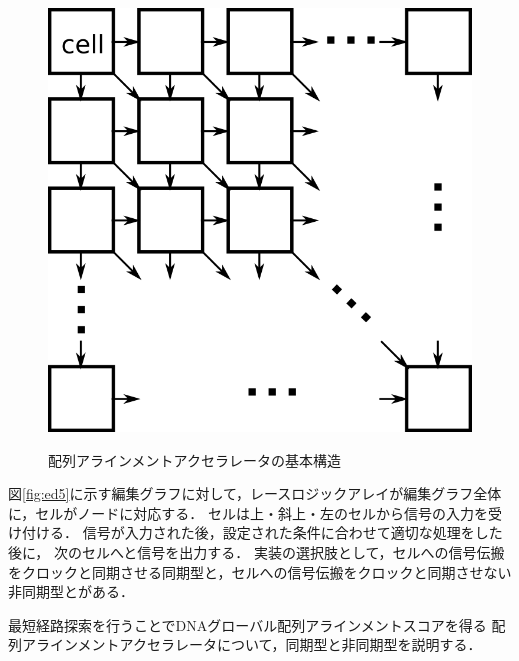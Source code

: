\begin{figure}[t!]
\begin{center}
{\includegraphics[keepaspectratio,scale=0.3]{fig/2/lightracelogic_2.png}}
\caption{配列アラインメントアクセラレータの基本構造}
\label{fig:racelogicarray}
\end{center}
\end{figure}
図\ref{fig:ed5}に示す編集グラフに対して，レースロジックアレイが編集グラフ全体に，セルがノードに対応する．
セルは上・斜上・左のセルから信号の入力を受け付ける．
信号が入力された後，設定された条件に合わせて適切な処理をした後に，
次のセルへと信号を出力する．
実装の選択肢として，セルへの信号伝搬をクロックと同期させる同期型と，セルへの信号伝搬をクロックと同期させない非同期型とがある．

最短経路探索を行うことでDNAグローバル配列アラインメントスコアを得る
配列アラインメントアクセラレータについて，同期型と非同期型を説明する．

